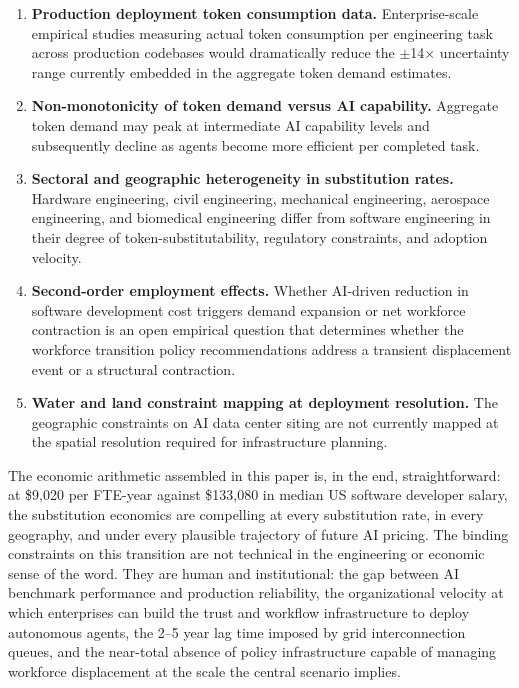\documentclass{article}
\begin{document}
\begin{enumerate}
  \item \textbf{Production deployment token consumption data.} Enterprise-scale empirical
    studies measuring actual token consumption per engineering task across production
    codebases would dramatically reduce the $\pm$14$\times$ uncertainty range currently
    embedded in the aggregate token demand estimates.
  \item \textbf{Non-monotonicity of token demand versus AI capability.} Aggregate token
    demand may peak at intermediate AI capability levels and subsequently decline as agents
    become more efficient per completed task.
  \item \textbf{Sectoral and geographic heterogeneity in substitution rates.} Hardware
    engineering, civil engineering, mechanical engineering, aerospace engineering, and
    biomedical engineering differ from software engineering in their degree of
    token-substitutability, regulatory constraints, and adoption velocity.
  \item \textbf{Second-order employment effects.} Whether AI-driven reduction in software
    development cost triggers demand expansion or net workforce contraction is an open
    empirical question that determines whether the workforce transition policy
    recommendations address a transient displacement event or a structural contraction.
  \item \textbf{Water and land constraint mapping at deployment resolution.} The geographic
    constraints on AI data center siting are not currently mapped at the spatial resolution
    required for infrastructure planning.
\end{enumerate}

The economic arithmetic assembled in this paper is, in the end, straightforward: at
\$9,020 per FTE-year against \$133,080 in median US software developer salary, the
substitution economics are compelling at every substitution rate, in every geography, and
under every plausible trajectory of future AI pricing. The binding constraints on this
transition are not technical in the engineering or economic sense of the word. They are
human and institutional: the gap between AI benchmark performance and production
reliability, the organizational velocity at which enterprises can build the trust and
workflow infrastructure to deploy autonomous agents, the 2--5 year lag time imposed by
grid interconnection queues, and the near-total absence of policy infrastructure capable
of managing workforce displacement at the scale the central scenario implies.
\end{document}
